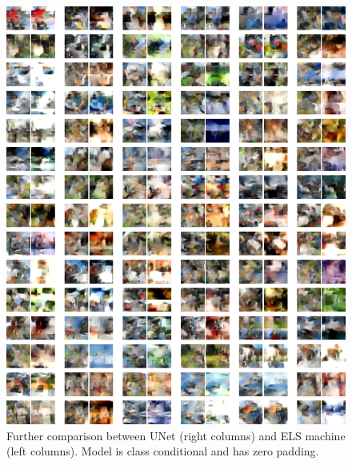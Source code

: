 \documentclass{article}
\theoremstyle{plain}
\theoremstyle{definition}
\theoremstyle{remark}
\begin{document}
\begin{figure}
    \centering
    \includegraphics[width=0.9\linewidth]{cifar10_zeros_samps_unet_m.png}
    \caption{Further comparison between UNet (right columns) and ELS machine (left columns). Model is class conditional and has zero padding.}
    \label{fig:cifar10-zeros}
\end{figure}

\end{document}
